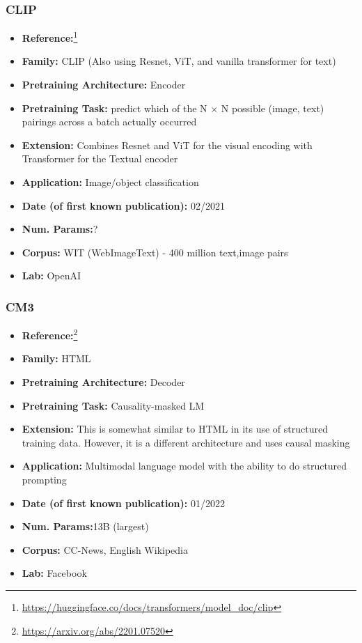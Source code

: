 \documentclass{article}
\begin{document}
\subsubsection{CLIP}

            \begin{itemize}
                \item \textbf{Reference:}\footnote{\url{https://huggingface.co/docs/transformers/model_doc/clip}}\cite{radford2021learning}
                \item \textbf{Family:} CLIP (Also using Resnet, ViT, and vanilla transformer for text) 
                \item \textbf{Pretraining Architecture:} Encoder
                \item \textbf{Pretraining Task:} predict which of the N × N possible (image, text) pairings across a batch actually occurred
                \item \textbf{Extension:} Combines Resnet and ViT for the visual encoding with Transformer for the Textual encoder  
                \item \textbf{Application:} Image/object classification
                \item \textbf{Date (of first known publication):} 02/2021
                \item \textbf{Num. Params:}?
                \item \textbf{Corpus:} WIT (WebImageText) - 400 million text,image pairs
                \item \textbf{Lab:} OpenAI
            \end{itemize}     
            
\subsubsection{CM3}

            \begin{itemize}
                \item \textbf{Reference:}\footnote{\url{https://arxiv.org/abs/2201.07520}}\cite{aghajanyan2022cm3}
                \item \textbf{Family:} HTML 
                \item \textbf{Pretraining Architecture:} Decoder
                \item \textbf{Pretraining Task:} Causality-masked LM
                \item \textbf{Extension:} This is somewhat similar to HTML in its use of structured training data. However, it is a different architecture and uses causal masking  
                \item \textbf{Application:} Multimodal language model with the ability to do structured prompting
                \item \textbf{Date (of first known publication):} 01/2022
                \item \textbf{Num. Params:}13B (largest)
                \item \textbf{Corpus:} CC-News, English Wikipedia
                \item \textbf{Lab:} Facebook
            \end{itemize}
\end{document}
